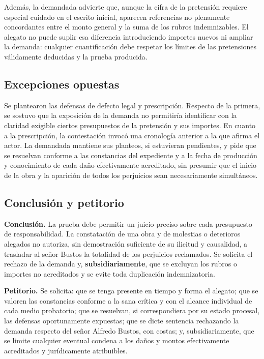 \documentclass[12pt,oneside]{book}
\begin{document}
Adem\'as, la demandada advierte que, aunque la cifra de la pretensi\'on requiere especial cuidado en el escrito inicial, aparecen referencias no plenamente concordantes entre el monto general y la suma de los rubros indemnizables. El alegato no puede suplir esa diferencia introduciendo importes nuevos ni ampliar la demanda: cualquier cuantificaci\'on debe respetar los l\'imites de las pretensiones v\'alidamente deducidas y la prueba producida.

\subsection{Excepciones opuestas}

Se plantearon las defensas de defecto legal y prescripci\'on. Respecto de la primera, se sostuvo que la exposici\'on de la demanda no permitir\'ia identificar con la claridad exigible ciertos presupuestos de la pretensi\'on y sus importes. En cuanto a la prescripci\'on, la contestaci\'on invoc\'o una cronolog\'ia anterior a la que afirma el actor. La demandada mantiene sus planteos, si estuvieran pendientes, y pide que se resuelvan conforme a las constancias del expediente y a la fecha de producci\'on y conocimiento de cada da\~no efectivamente acreditado, sin presumir que el inicio de la obra y la aparici\'on de todos los perjuicios sean necesariamente simult\'aneos.

\subsection{Conclusi\'on y petitorio}

\textbf{Conclusi\'on.} La prueba debe permitir un juicio preciso sobre cada presupuesto de responsabilidad. La constataci\'on de una obra y de molestias o deterioros alegados no autoriza, sin demostraci\'on suficiente de su ilicitud y causalidad, a trasladar al se\~nor Bustos la totalidad de los perjuicios reclamados. Se solicita el rechazo de la demanda y, \textbf{subsidiariamente}, que se excluyan los rubros o importes no acreditados y se evite toda duplicaci\'on indemnizatoria.

\textbf{Petitorio.} Se solicita: que se tenga presente en tiempo y forma el alegato; que se valoren las constancias conforme a la sana cr\'itica y con el alcance individual de cada medio probatorio; que se resuelvan, si correspondiera por su estado procesal, las defensas oportunamente expuestas; que se dicte sentencia rechazando la demanda respecto del se\~nor Alfredo Bustos, con costas; y, subsidiariamente, que se limite cualquier eventual condena a los da\~nos y montos efectivamente acreditados y jur\'idicamente atribuibles.
\end{document}
